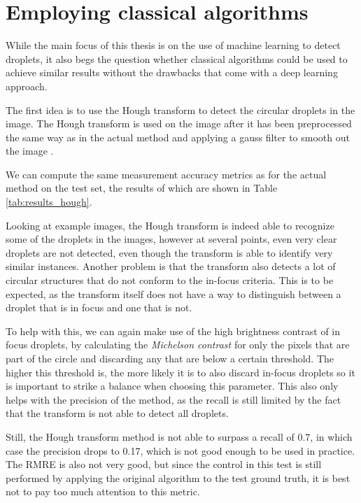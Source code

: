 \section{Employing classical algorithms}

While the main focus of this thesis is on the use of machine learning to detect droplets, it also begs the question whether classical algorithms could be used to achieve similar results without the drawbacks that come with a deep learning approach.

The first idea is to use the Hough transform to detect the circular droplets in the image. 
The Hough transform is used on the image after it has been preprocessed the same way as in the actual method and applying a gauss filter to smooth out the image \cite{OpenCVFeatureDetection}.

We can compute the same measurement accuracy metrics as for the actual method on the test set, the results of which are shown in Table \ref{tab:results_hough}.

Looking at example images, the Hough transform is indeed able to recognize some of the droplets in the images, however at several points, even very clear droplets are not detected, even though the transform is able to identify very similar instances. 
Another problem is that the transform also detects a lot of circular structures that do not conform to the in-focus criteria. 
This is to be expected, as the transform itself does not have a way to distinguish between a droplet that is in focus and one that is not.

To help with this, we can again make use of the high brightness contrast of in focus droplets, by calculating the \emph{Michelson contrast} for only the pixels that are part of the circle and discarding any that are below a certain threshold.
The higher this threshold is, the more likely it is to also discard in-focus droplets so it is important to strike a balance when choosing this parameter.
This also only helps with the precision of the method, as the recall is still limited by the fact that the transform is not able to detect all droplets.

Still, the Hough transform method is not able to surpass a recall of 0.7, in which case the precision drops to 0.17, which is not good enough to be used in practice.
The RMRE is also not very good, but since the control in this test is still performed by applying the original algorithm to the test ground truth, it is best not to pay too much attention to this metric.

